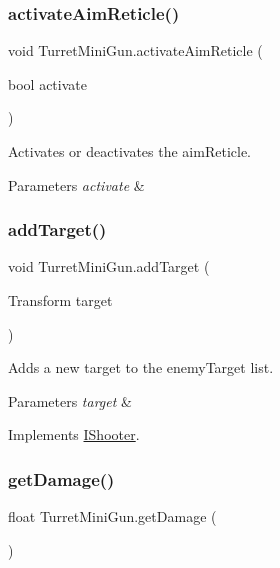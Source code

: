 \subsubsection{\texorpdfstring{activate\+Aim\+Reticle()}{activateAimReticle()}}
{\footnotesize\ttfamily void Turret\+Mini\+Gun.\+activate\+Aim\+Reticle (\begin{DoxyParamCaption}\item[{bool}]{activate }\end{DoxyParamCaption})}



Activates or deactivates the aim\+Reticle. 


\begin{DoxyParams}{Parameters}
{\em activate} & \\
\hline
\end{DoxyParams}
\mbox{\label{class_turret_mini_gun_a355f34666865396437c32fab8d2a3b51}} 
\subsubsection{\texorpdfstring{add\+Target()}{addTarget()}}
{\footnotesize\ttfamily void Turret\+Mini\+Gun.\+add\+Target (\begin{DoxyParamCaption}\item[{Transform}]{target }\end{DoxyParamCaption})}



Adds a new target to the enemy\+Target list. 


\begin{DoxyParams}{Parameters}
{\em target} & \\
\hline
\end{DoxyParams}


Implements \mbox{\hyperlink{interface_i_shooter}{I\+Shooter}}.

\mbox{\label{class_turret_mini_gun_ac1c64dbcd1857130d1bd6786c6e695b9}} 
\subsubsection{\texorpdfstring{get\+Damage()}{getDamage()}}
{\footnotesize\ttfamily float Turret\+Mini\+Gun.\+get\+Damage (\begin{DoxyParamCaption}{ }\end{DoxyParamCaption})}



